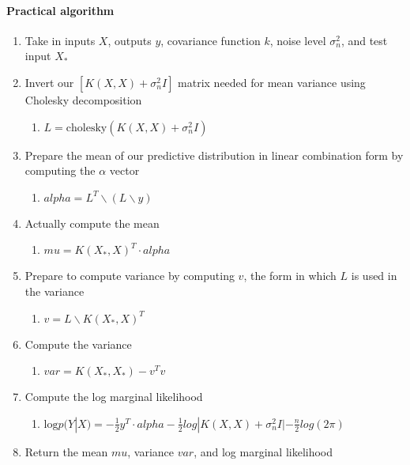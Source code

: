 \documentclass[12pt]{article}
\begin{document}
\paragraph{Practical algorithm}
\begin{enumerate}
    \item Take in inputs $X$, outputs $y$, covariance function $k$, noise level $\sigma^2_n$, and test input $X_*$
    \item Invert our $[K(X,X) + \sigma^2_nI]$ matrix needed for mean variance using Cholesky decomposition
    \begin{enumerate}
        \item $L = \text{cholesky}(K(X,X) + \sigma_n^2I)$
    \end{enumerate}
    \item Prepare the mean of our predictive distribution in linear combination form by computing the $\alpha$ vector
    \begin{enumerate}
        \item $alpha = L^T \backslash (L \backslash y)$
    \end{enumerate}
    \item Actually compute the mean
    \begin{enumerate}
        \item $mu = K(X_*, X)^T \cdot alpha$
    \end{enumerate}
    \item Prepare to compute variance by computing $v$, the form in which $L$ is used in the variance
    \begin{enumerate}
        \item $v = L \backslash K(X_*, X)^T$
    \end{enumerate}
    \item Compute the variance
    \begin{enumerate}
        \item $var = K(X_*, X_*) - v^T v$
    \end{enumerate}
    \item Compute the log marginal likelihood 
    \begin{enumerate}
        \item $\text{log} p(Y|X) = -\frac{1}{2}y^T \cdot alpha - \frac{1}{2}log|K(X,X) + \sigma^2_nI| - \frac{n}{2}log(2\pi)$
    \end{enumerate}
    \item Return the mean $mu$, variance $var$, and log marginal likelihood
\end{enumerate}


\printbibliography
\end{document}
